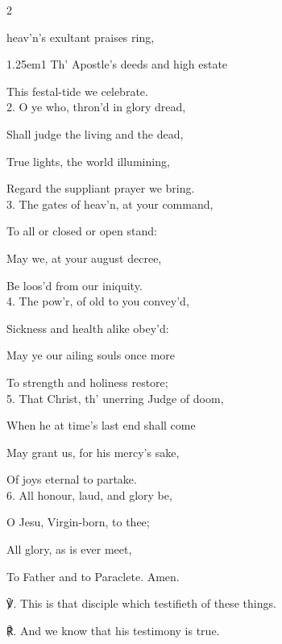 \begin{multicols}{2}
\sloppy
	
 heav'n's exultant praises ring,


\begin{hangparas}{1.25em}{1}
Th' Apostle's deeds and high estate

This festal-tide we celebrate.\\

2. O ye who, thron'd in glory dread,

Shall judge the living and the dead,

True lights, the world illumining,

Regard the suppliant prayer we bring.\\

3. The gates of heav'n, at your command,

To all or closed or open stand:

May we, at your august decree,

Be loos'd from our iniquity.\\

4. The pow'r, of old to you convey'd,

Sickness and health alike obey'd:

May ye our ailing souls once more

To strength and holiness restore;\\

5. That Christ, th' unerring Judge of doom,

When he at time's last end shall come

May grant us, for his mercy's sake,

Of joys eternal to partake.\\

6. All honour, laud, and glory be,

O Jesu, Virgin-born, to thee;

All glory, as is ever meet,

To Father and to Paraclete. Amen.\\
\end{hangparas}

℣. This is that disciple which testifieth of these things.

℟. And we know that his testimony is true.


\fussy
\end{multicols}


